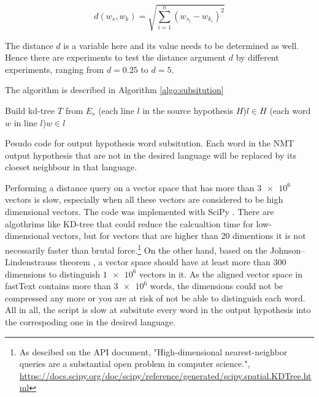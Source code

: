 \documentclass[thesis,fonts=libertine]{cluu}
\begin{document}
\begin{equation}
  d(w_s, w_k)=\sqrt{\sum_{i=1}^n{(w_{s_i}-w_{k_i})}^2}
\end{equation}

The distance $d$ is a variable here and its value needs to be determined as well. Hence there are experiments to test the distance argument $d$ by different experiments, ranging from $d=0.25$ to $d=5$.

The algorithm is described in Algorithm \ref{algo:subsitution}

\begin{algorithm}[H]
  \SetAlgoLined

  Build kd-tree $T$ from $E_s$
  \For(each line $l$ in the source hypothesis $H$){$l \in H$}{
    \For(each word $w$ in line $l$){$w \in l$}{
    }
  }
  \caption{Pesudo code for output hypothesis word subsitution. Each word in the NMT output hypothesis that are not in the desired language will be replaced by its cloeset neighbour in that language.}
  \label{algo:subsitution}
\end{algorithm}

Performing a distance query on a vector space that has more than $\num{3e6}$ vectors is slow, especially when all these vectors are considered to be high dimensional vectors. The code was implemented with SciPy \parencite{Virtanen:2019aa}. There are algothrims like KD-tree \parencite{Maneewongvatana:aa} that could reduce the calcualtion time for low-dimensional vectors, but for vectors that are higher than 20 dimentions it is not necessarily faster than brutal force.\footnote{As descibed on the API document, "High-dimensional nearest-neighbor queries are a substantial open problem in computer science.", \url{https://docs.scipy.org/doc/scipy/reference/generated/scipy.spatial.KDTree.html}} On the other hand, based on the Johnson–Lindenstrauss theorem \parencite{johnson1984extensions}, a vector space should have at least more than 300 dimensions to distinguish $\num{1e6}$ vectors in it. As the aligned vector space in fastText contains more than $\num{3e6}$ words, the dimensions could not be compressed any more or you are at risk of not be able to distinguish each word. All in all, the script is slow at subsitute every word in the output hypothesis into the correspoding one in the desired language.
\end{document}
